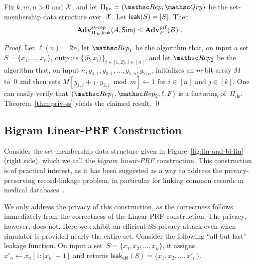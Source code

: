 \begin{theorem}%
\label{thm:lin-privacy} Fix $k,m,n>0$ and ${\cal X}$, and let
$\setprim_{\mathrm{lin}}= (\Rep, \Qry)$ be the set-membership data
structure over~${\cal X}$. Let ${\sf leak}(S)=|S|$.  Then 
\[
\mathrm{\mathbf{Adv}}^{\mathrm{ss\mbox{-}rep}}_{\Pi_{\mathrm{ds}},{\sf leak}}(A,{\sf Sim}) \leq  \mathbf{Adv}^{\mathrm{prf}}_{F}(B)\;.
\]
\end{theorem}
\begin{proof}
Let $\ell(n) = 2n$, let $\Rep_1$ be the algorithm that, on input a
set $S=\{x_1,\ldots,x_n\}$, outputs $\{\langle b,x_i \rangle\}_{b\in
\{1,2\}, i \in [n]}$, and let $\Rep_2$ be the algorithm that, on
input $n,y_{1,1}, y_{2,1}, \ldots, y_{1,n}, y_{2,n}$,  initializes
an $m$-bit array $M$ to~0 and then sets $M[y_{1,i}+j \cdot y_{2,i}
\bmod m] \gets 1$ for $i \in [n]$ and $j \in [k]$. One can easily
verify that $(\Rep_1, \Rep_2, \ell, F)$ is a factoring
of~$\Pi_{\mathrm{ds}}$. Theorem~\ref{thm:priv-ss} yields the claimed
result. \hfill\qed
\end{proof}

\subsection{Bigram Linear-PRF Construction}
Consider the set-membership data structure given in
Figure~\ref{fig:lin-and-bi-lin} (right side), which we call the
\emph{bigram linear-PRF} construction.  This construction is of
practical interest, as it has been suggested as a way to address the
privacy-preserving record-linkage problem, in particular for linking
common records in medical
databases~\cite{niedermeyer2014cryptanalysis}. %

 We only address the privacy of this
construction, as the correctness follows immediately from the
correctness of the Linear-PRF construction.  The privacy, however,
does not.  Here we exhibit an efficient SS-privacy attack even when
simulator is provided nearly the entire set.  Consider the following
``all-but-last'' leakage function. On input a
set~$S=\{x_1,x_2,\ldots,x_n\}$, it assigns $x'_n \gets
x_n[1:|x_n|-1]$ and returns
$\mathsf{leak_{abl}}(S)=\{x_1,x_2,\ldots,x'_n\}$.

